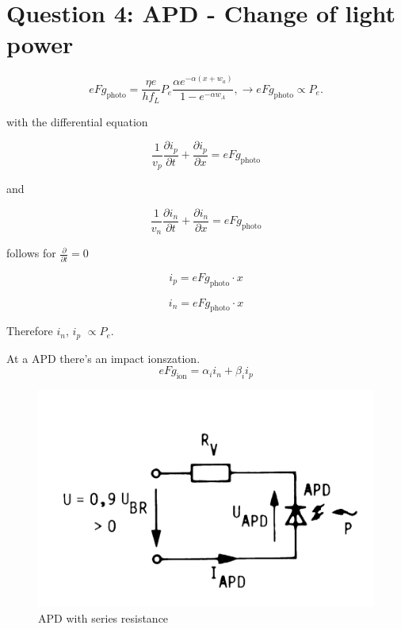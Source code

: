  

\section{Question 4: APD - Change of light power}

\begin{equation}
eFg_{\mathrm{photo}} = \frac{\eta e}{hf_L}P_e\frac{\alpha e^{-\alpha(x+w_a)}}{1-e^{-\alpha w_A}}, \rightarrow eFg_{\mathrm{photo}} \propto P_e.
\label{eq:}
\end{equation}

with the differential equation

\begin{equation}
\frac{1}{v_p} \frac{\partial i_p}{\partial t} +\frac{\partial i_p}{\partial x} = eFg_{\mathrm{photo}} 
\label{eq:}
\end{equation}

and

\begin{equation}
\frac{1}{v_n} \frac{\partial i_n}{\partial t} +\frac{\partial i_n}{\partial x} = eFg_{\mathrm{photo}} 
\label{eq:}
\end{equation}

follows for $\frac{\partial}{\partial t} = 0$


\begin{equation}
i_p = eFg_{\mathrm{photo}}\cdot x
\label{eq:}
\end{equation}

\begin{equation}
i_n = eFg_{\mathrm{photo}}\cdot x
\label{eq:}
\end{equation}

Therefore $i_n$, $i_p$ $\propto P_e$.

At a APD there's an impact ionszation. 
\begin{equation}
eFg_{\mathrm{ion}} = \alpha_i i_n + \beta_i i_p
\label{eq:}
\end{equation}


\begin{figure}%
\centering
\includegraphics[width=.5\columnwidth]{Grafiken/Q4_APD.jpg}%
\caption{APD with series resistance}%
\label{fig:Q4_APD}%
\end{figure}
